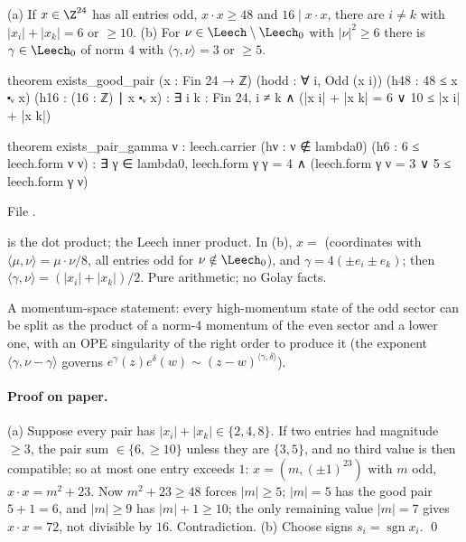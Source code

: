\begin{theorem}\label{ch14:thm:pair}
(a) If $x\in\Z^{24}$ has all entries odd, $x\cdot x\ge48$ and $16\mid x\cdot x$, there are $i\ne k$ with
$|x_i|+|x_k|=6$ or $\ge10$.  (b) For $\nu\in\Leech\setminus\Leech_0$ with $|\nu|^2\ge6$ there is $\gamma\in\Leech_0$
of norm $4$ with $\langle\gamma,\nu\rangle=3$ or $\ge5$.
\end{theorem}
\begin{leancode}
theorem exists_good_pair (x : Fin 24 → ℤ) (hodd : ∀ i, Odd (x i)) (h48 : 48 ≤ x ⬝ᵥ x)
    (h16 : (16 : ℤ) ∣ x ⬝ᵥ x) :
    ∃ i k : Fin 24, i ≠ k ∧ (|x i| + |x k| = 6 ∨ 10 ≤ |x i| + |x k|)

theorem exists_pair_gamma {ν : leech.carrier} (hν : ν ∉ lambda0) (h6 : 6 ≤ leech.form ν ν) :
    ∃ γ ∈ lambda0, leech.form γ γ = 4 ∧ (leech.form γ ν = 3 ∨ 5 ≤ leech.form γ ν)
\end{leancode}
File .

\begin{dictionary}
 is the dot product;  the Leech inner product.  In (b), $x=$ 
(coordinates with $\langle\mu,\nu\rangle=\mu\cdot\nu/8$, all entries odd for $\nu\notin\Leech_0$), and
$\gamma=4(\pm e_i\pm e_k)$; then $\langle\gamma,\nu\rangle=(|x_i|+|x_k|)/2$.  Pure arithmetic; no Golay facts.
\end{dictionary}

\begin{physics}
A momentum-space statement: every high-momentum state of the odd sector can be split as the
product of a norm-4 momentum of the even sector and a lower one, with an OPE singularity of the right
order to produce it (the exponent $\langle\gamma,\nu-\gamma\rangle$ governs $e^\gamma(z)e^{\delta}(w)\sim(z-w)^{\langle\gamma,\delta\rangle}$).
\end{physics}

\paragraph{Proof on paper.}  (a) Suppose every pair has $|x_i|+|x_k|\in\{2,4,8\}$.  If two entries
had magnitude $\ge3$, the pair sum $\in\{6,\ge10\}$ unless they are $\{3,5\}$, and no third value is then
compatible; so at most one entry exceeds $1$: $x=(m,(\pm1)^{23})$ with $m$ odd, $x\cdot x=m^2+23$.  Now $m^2+23\ge48$ forces $|m|\ge5$; $|m|=5$ has the
good pair $5+1=6$, and $|m|\ge9$ has $|m|+1\ge10$; the only remaining value $|m|=7$ gives $x\cdot x=72$,
not divisible by $16$.  Contradiction.  (b) Choose signs $s_i=\operatorname{sgn}x_i$. \qed

